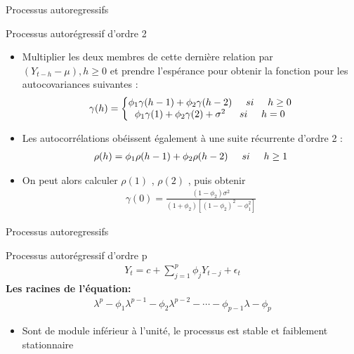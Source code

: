 \documentclass{beamer}
\begin{document}
\begin{frame}{Processus autoregressifs}
\begin{block}{Processus autorégressif d’ordre 2}
\begin{itemize}
\item Multiplier les deux membres de cette dernière relation par $(Y_{t-h}-\mu),h \geq 0$ et prendre l’espérance pour obtenir la fonction pour les autocovariances suivantes :
\begin{align*}
\gamma(h)=\left\{\begin{matrix}
\phi_1 \gamma(h-1)+\phi_2\gamma(h-2) \hspace{0.5cm} si \hspace{0.5cm} h\ge0  \\ 
\phi_1 \gamma(1)+\phi_2 \gamma(2)+\sigma^2  \hspace{0.5cm} si \hspace{0.5cm} h=0  
\end{matrix}\right.
\end{align*}
\item Les autocorrélations obéissent également à une suite récurrente d’ordre 2 :
\begin{align*}
\rho(h)=\phi_1 \rho(h-1)+\phi_2 \rho(h-2)  \hspace{0.5cm} si \hspace{0.5cm} h\ge1
\end{align*}
\item On peut alors calculer $\rho(1)$ , $\rho(2)$ , puis obtenir
\begin{align*}
\gamma(0)=\frac{(1-\phi_2)\sigma^2}{(1+\phi_2)[(1-\phi_2)^2-\phi_1^2]}
\end{align*}
\end{itemize}
\end{block}
\end{frame}



\begin{frame}{Processus autoregressifs}
\begin{block}{Processus autorégressif d’ordre p}
\begin{align*}
Y_t=c+\sum_{j=1}^p\phi_jY_{t-j}+\epsilon_t
\end{align*}
\textbf{Les racines de l'équation:}
\begin{align*}
\lambda^p-\phi_1\lambda^{p-1}-\phi_2\lambda^{p-2}-\cdots -\phi_{p-1}\lambda-\phi_p
\end{align*}
\begin{itemize}
\item Sont de module inférieur à l’unité, le processus est stable et faiblement stationnaire 
\end{itemize}
\end{block}
\end{frame}
\end{document}

